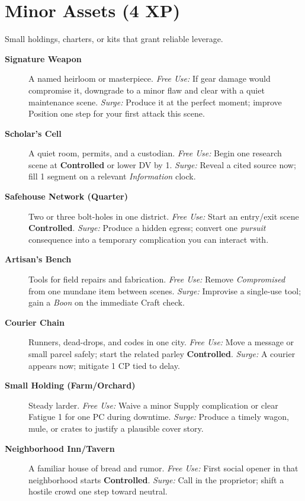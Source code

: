 \section{Minor Assets (4 XP)}
Small holdings, charters, or kits that grant reliable leverage.
\begin{description}
  \item[\textbf{Signature Weapon}]  A named heirloom or masterpiece. \emph{Free Use:} If gear damage would compromise it, downgrade to a minor flaw and clear with a quiet maintenance scene. \emph{Surge:} Produce it at the perfect moment; improve Position one step for your first attack this scene.
  \item[\textbf{Scholar’s Cell}]  A quiet room, permits, and a custodian. \emph{Free Use:} Begin one research scene at \textbf{Controlled} or lower DV by 1. \emph{Surge:} Reveal a cited source now; fill 1 segment on a relevant \emph{Information} clock.
  \item[\textbf{Safehouse Network (Quarter)}]  Two or three bolt-holes in one district. \emph{Free Use:} Start an entry/exit scene \textbf{Controlled}. \emph{Surge:} Produce a hidden egress; convert one \emph{pursuit} consequence into a temporary complication you can interact with.
  \item[\textbf{Artisan’s Bench}]  Tools for field repairs and fabrication. \emph{Free Use:} Remove \emph{Compromised} from one mundane item between scenes. \emph{Surge:} Improvise a single-use tool; gain a \emph{Boon} on the immediate Craft check.
  \item[\textbf{Courier Chain}]  Runners, dead-drops, and codes in one city. \emph{Free Use:} Move a message or small parcel safely; start the related parley \textbf{Controlled}. \emph{Surge:} A courier appears now; mitigate 1 CP tied to delay.
  \item[\textbf{Small Holding (Farm/Orchard)}]  Steady larder. \emph{Free Use:} Waive a minor Supply complication or clear Fatigue 1 for one PC during downtime. \emph{Surge:} Produce a timely wagon, mule, or crates to justify a plausible cover story.
  \item[\textbf{Neighborhood Inn/Tavern}]  A familiar house of bread and rumor. \emph{Free Use:} First social opener in that neighborhood starts \textbf{Controlled}. \emph{Surge:} Call in the proprietor; shift a hostile crowd one step toward neutral.

\end{description}
